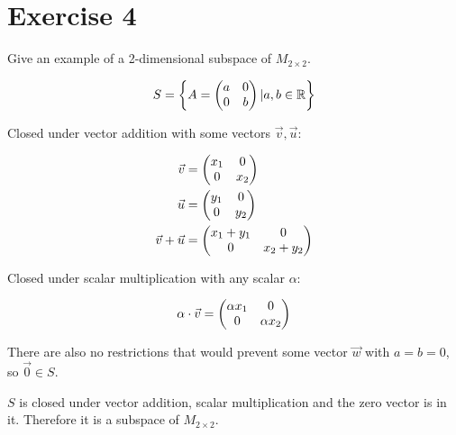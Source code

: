 \section*{Exercise 4}

Give an example of a 2-dimensional subspace of $M_{2 \times 2}$.

\[S = \left\{ A =  \begin{pmatrix} a&0\\0&b \end{pmatrix}  | a,b \in \mathbb{R} \right\}\]

Closed under vector addition with some vectors $\vec{v}, \vec{u}$:

\[
	\begin{aligned}
		\vec{v} &=  \begin{pmatrix} x_1 & 0 \\ 0 & x_2 \end{pmatrix}  \\ 
		\vec{u} &=  \begin{pmatrix} y_1 & 0 \\ 0 & y_2 \end{pmatrix}  \\
		\vec{v} + \vec{u} &=  \begin{pmatrix} x_1 + y_1 & 0 \\ 0 & x_2 + y_2 \end{pmatrix} 
	\end{aligned}
\]

Closed under scalar multiplication with any scalar $\alpha$:

\[
	\begin{aligned}
		\alpha \cdot \vec{v} =  \begin{pmatrix} \alpha x_1 & 0 \\ 0 & \alpha x_2 \end{pmatrix} 
	\end{aligned}
\]

There are also no restrictions that would prevent some vector $\vec{w}$ with $a=b=0$, so $\vec{0} \in S$.

$S$ is closed under vector addition, scalar multiplication and the zero vector is in it. Therefore it is a subspace of $M_{2 \times 2}$.
